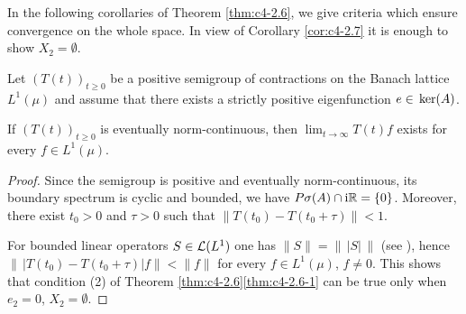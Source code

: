 In the following corollaries of Theorem \ref{thm:c4-2.6}, we give criteria which ensure convergence on the whole space.
In view of Corollary \ref{cor:c4-2.7} it is enough to show $X_{2} = \emptyset$.
\begin{corollary}\label{cor:c4-2.9}
%
%
%
Let $(T(t))_{t \geq 0}$ be a positive semigroup of contractions on the Banach lattice $L^{1}(\mu)$ and assume that there exists a strictly positive eigenfunction $e \in \mathop{}\mathrm{ker}(A)$.

If $(T(t))_{t \geq 0}$ is eventually norm-continuous, then $\lim_{t \to \infty}T(t)f$ exists for every $f \in L^{1}(\mu)$.
\end{corollary}
\begin{proof}
Since the semigroup is positive and eventually norm-continuous, its boundary spectrum is cyclic and bounded, \ie  we have $P{\sigma}(A) \cap \mathrm{i}\mathbb{R} = \{0\}$.
Moreover, there exist $t_{0} > 0$ and $\tau > 0$ such that $\|T(t_{0}) - T(t_{0}+\tau)\| < 1$.

For bounded linear operators $S \in \mathcal{L}(L^{1})$ 
one has $\|S\| = \|\,|S|\,\|$ (see \citet[IV, Theorem 1.5]{schaefer:1974}), hence $\|\,|T(t_{0}) - T(t_{0}+\tau)| f\| < \|f\|$ for every $f \in L^{1}(\mu)$, $f \neq 0$.
This shows that condition (2) of Theorem \ref{thm:c4-2.6}\ref{thm:c4-2.6-1} can be true only when $e_{2} = 0$, \ie  $X_{2} = \emptyset$.
\end{proof}

